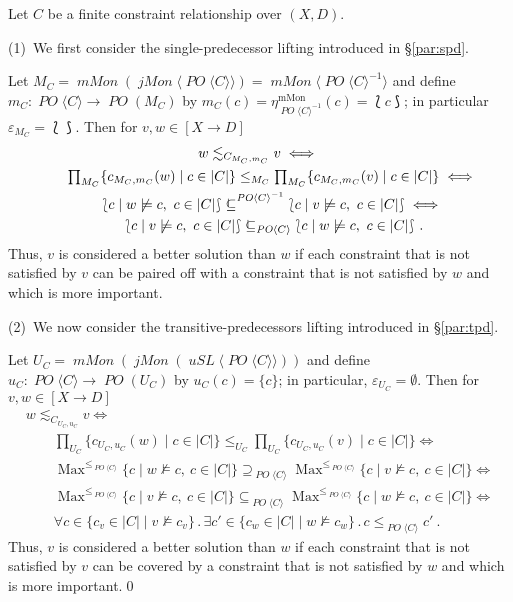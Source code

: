 \documentclass[english]{notes}
\let\lbagold\lbag
\let\rbagold\rbag
\def\lbag{\mathopen{\lbagold}}
\def\rbag{\mathclose{\rbagold}}
\DeclareMathOperator{\Maxop}{\mathrm{Max}}
\newcommand{\Max}[1]{\Maxop^{#1}}
\newcommand{\lowersubseteq}[1]{\mathrel{\subseteq_{#1}}}
\newcommand{\lowersupseteq}[1]{\mathrel{\supseteq_{#1}}}
\newcommand{\submseteq}{%
\mathrel{\mathchoice%
{\mathnormal{\subseteq}\llap{\text{\raisebox{0.3pt}{\fontsize{10pt}{10pt}\selectfont\rotatebox{90}{$-$}\hspace{2.5pt}}}}}%
{\mathnormal{\subseteq}\llap{\text{\raisebox{0.3pt}{\fontsize{10pt}{10pt}\selectfont\rotatebox{90}{$-$}\hspace{2.5pt}}}}}%
{\mathnormal{\subseteq}\llap{\text{\raisebox{-0.3pt}{\fontsize{7pt}{7pt}\selectfont\rotatebox{90}{$-$}\hspace{1pt}}}}}%
{\mathnormal{\subseteq}\llap{\text{\raisebox{-0.3pt}{\fontsize{7pt}{7pt}\selectfont\rotatebox{90}{$-$}\hspace{1pt}}}}}%
}}
\newcommand{\lowersubmseteq}[1]{\mathrel{\submseteq_{#1}}}
\newcommand{\uppersubmseteq}[1]{\mathrel{\submseteq^{#1}}}
\newcommand{\category}[1]{\mathrm{#1}}
\newcommand{\mMoncat}{\category{mMon}}
\newcommand{\functor}[1]{\mathit{#1}}
\DeclareMathOperator{\POfun}{\functor{PO}}
\DeclareMathOperator{\uSLfun}{\functor{uSL}}
\DeclareMathOperator{\jMonfun}{\functor{jMon}}
\DeclareMathOperator{\mMonfun}{\functor{mMon}}
\newcommand{\uSLfree}[1]{\uSLfun\langle#1\rangle}
\newcommand{\jMonfree}[1]{\jMonfun\langle#1\rangle}
\newcommand{\mMonfree}[1]{\mMonfun\langle#1\rangle}
\newcommand{\mMoneta}{\eta^{\mMoncat}}
\newcommand{\mMonetaat}[1]{\mMoneta_{#1}}
\newcommand{\POfree}[1]{\POfun\langle#1\rangle}
\begin{document}
\begin{example}
Let $C$ be a finite constraint relationship over $(X, D)$.

\smallskip

(1)~We first consider the single-predecessor lifting introduced in
§\ref{par:spd}.

Let $M_C = \mMonfun(\jMonfree{\POfree{C}}) =
\mMonfree{\POfree{C}^{-1}}$ and define $m_C : \POfree{C} \to
\POfun(M_C)$ by $m_C(c) = \mMonetaat{\POfree{C}^{-1}}(c) = \lbag c
\rbag$; in particular $\varepsilon_{M_C} = \lbag \rbag$.  Then for $v,
w \in [X \to D]$
%
\begin{gather*}
\textstyle
  w \lesssim_{C_{M_C, m_C}} v
\iff{}\\\textstyle\qquad
  \prod_{M_C} \{ c_{M_C, m_C}(w) \mid c \in |C| \} \leq_{M_C} \prod_{M_C} \{ c_{M_C, m_C}(v) \mid c \in |C| \}
\iff{}\\\textstyle\qquad
  \lbag c \mid w \not\models c,\ c \in |C| \rbag \uppersubmseteq{\POfree{C}^{-1}} \lbag c \mid v \not\models c,\ c \in |C| \rbag
\iff{}\\\textstyle\qquad
  \lbag c \mid v \not\models c,\ c \in |C| \rbag \lowersubmseteq{\POfree{C}} \lbag c \mid w \not\models c,\ c \in |C| \rbag
\ \text{.}
\end{gather*}
%
Thus, $v$ is considered a better solution than $w$ if each constraint that is
not satisfied by $v$ can be paired off with a constraint that is not
satisfied by $w$ and which is more important.

\smallskip

(2)~We now consider the transitive-predecessors lifting introduced in
§\ref{par:tpd}.

Let $U_C = \mMonfun(\jMonfun(\uSLfree{\POfree{C}}))$
and define $u_C : \POfree{C} \to \POfun(U_C)$ by $u_C(c) = \{ c \}$;
in particular, $\varepsilon_{U_C} = \emptyset$.  Then for $v, w \in [X
\to D]$
%
\begin{gather*}
\textstyle
  w \lesssim_{C_{U_C, u_C}} v
\iff{}\\\textstyle\qquad
  \prod_{U_C} \{ c_{U_C, u_C}(w) \mid c \in |C| \} \leq_{U_C} \prod_{U_C} \{ c_{U_C, u_C}(v) \mid c \in |C| \}
\iff{}\\\textstyle\qquad
  \Max{\leq_{\POfree{C}}} \{ c \mid w \not\models c,\ c \in |C| \} \lowersupseteq{\POfree{C}} \Max{\leq_{\POfree{C}}} \{ c \mid v \not\models c,\ c \in |C| \}
\iff{}\\\textstyle\qquad
  \Max{\leq_{\POfree{C}}} \{ c \mid v \not\models c,\ c \in |C| \} \lowersubseteq{\POfree{C}} \Max{\leq_{\POfree{C}}} \{ c \mid w \not\models c,\ c \in |C| \}
\iff{}\\\textstyle\qquad
  \forall c \in \{ c_v \in |C| \mid v \not\models c_v \} \,.\, \exists c' \in \{ c_w \in |C| \mid w \not\models c_w \} \,.\, c \leq_{\POfree{C}} c'
\ \text{.}
\end{gather*}
%
Thus, $v$ is considered a better solution than $w$ if each constraint
that is not satisfied by $v$ can be covered by a constraint that is
not satisfied by $w$ and which is more important.\qed
\end{example}
\end{document}
